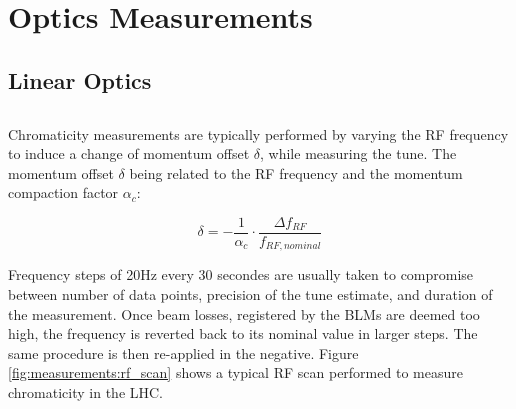 \section{Optics Measurements}



\subsection{Linear Optics}




\subsection{}

\subsubsection{}

Chromaticity measurements are typically performed by varying the RF frequency to induce a change of
momentum offset $\delta$, while measuring the tune.  The momentum offset $\delta$ being related to
the RF frequency and the momentum compaction factor $\alpha_c$:

\begin{equation}
    \delta = - \frac{1}{\alpha_c} \cdot \frac{\Delta f_{RF}}{f_{RF,nominal}}
    \label{eq:dpp_rf}
\end{equation}

Frequency steps of 20Hz every 30 secondes are usually taken to compromise between number of data
points, precision of the tune estimate, and duration of the measurement. Once beam losses,
registered by the BLMs are deemed too high, the frequency is reverted back to its nominal value in
larger steps. The same procedure is then re-applied in the negative. Figure
\ref{fig:measurements:rf_scan} shows a typical RF scan performed to measure chromaticity in the LHC.

